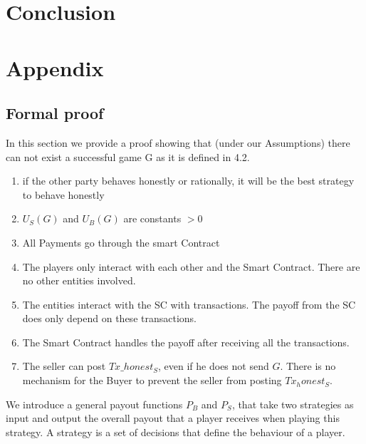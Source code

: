 \documentclass{cacthesis}
\begin{document}
\chapter{Conclusion}

\chapter{Appendix}

\section{Formal proof}
\label{sec:formal-proof}
In this section we provide a proof showing that (under our Assumptions) there can not exist  a successful game G as it is defined in 4.2.

\begin{enumerate}
    \item if the other party behaves honestly or rationally, it will be the best strategy to behave honestly
    \item $U_S(G)$ and $U_B(G)$ are constants $> 0$
    \item All Payments go through the smart Contract
    \item The players only interact with each other and the Smart Contract. There are no other entities involved.
    \item The entities interact with the SC with transactions. The payoff from the SC does only depend on these transactions.
    \item The Smart Contract handles the payoff after receiving all the transactions.
    \item The seller can post $Tx\_honest_S$, even if he does not send $G$. There is no mechanism for the Buyer to prevent the seller from posting $Tx_honest_S$.

\end{enumerate}


We introduce a general payout functions $P_B$ and $P_S$, that take two strategies as input and output the overall payout that a player receives when playing this strategy.\newline
A strategy is a set of decisions that define the behaviour of a player. %
\end{document}
